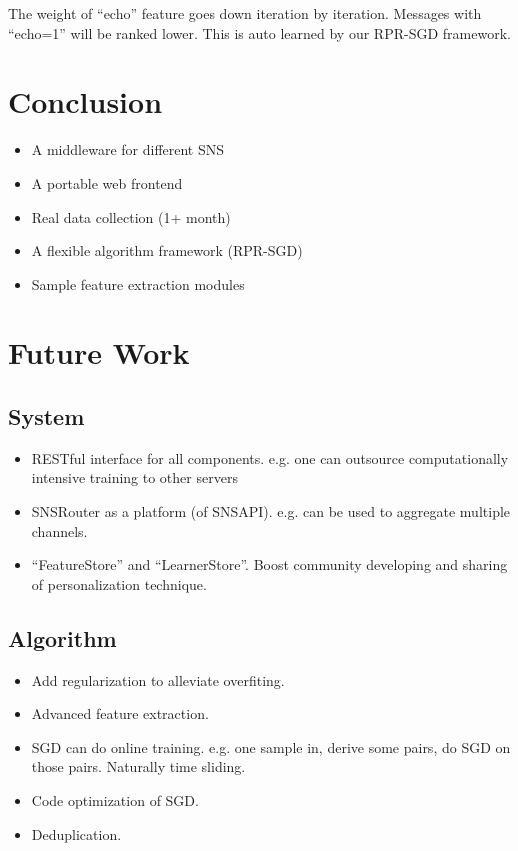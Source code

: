 \documentclass{sig-alternate}
\begin{document}
The weight of ``echo'' feature goes down iteration by iteration. Messages with ``echo=1''
will be ranked lower. This is auto learned by our RPR-SGD framework.

\section{Conclusion}
\label{sec:Conclusion}

\begin{itemize}
	\item A middleware for different SNS
	\item A portable web frontend
	\item Real data collection (1+ month)
	\item A flexible algorithm framework (RPR-SGD)
	\item Sample feature extraction modules
\end{itemize}



\section{Future Work}
\label{sec:Future Work}

\subsection{System}
\label{sec:fu_System}

\begin{itemize}
	\item RESTful interface for all components.
		e.g. one can outsource computationally
		intensive training to other servers
	\item SNSRouter as a platform (of SNSAPI).
		e.g. can be used to aggregate multiple
		channels. 
	\item ``FeatureStore'' and ``LearnerStore''. 
		Boost community developing and sharing of 
		personalization technique. 
\end{itemize}

\subsection{Algorithm}
\label{sec:fu_Algorithm}

\begin{itemize}
	\item Add regularization to alleviate overfiting. 
	\item Advanced feature extraction.
	\item SGD can do online training.
	e.g. one sample in, derive some pairs, do
	SGD on those pairs.
	Naturally time sliding.
	\item Code optimization of SGD. 
	\item Deduplication. 
\end{itemize}
\end{document}
